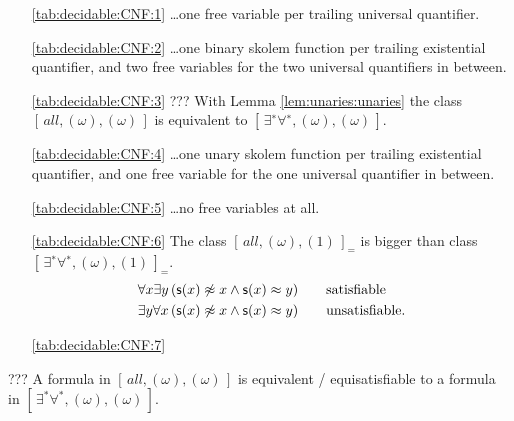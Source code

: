 \begin{itemize}
	\item[\ref{tab:decidable:CNF:1}] 
	\ldots one free variable per trailing universal quantifier.
	
	\item[\ref{tab:decidable:CNF:2}]
	\ldots one binary skolem function per trailing existential quantifier, 
	and two free variables for the two universal quantifiers in between.
	
	\item[\ref{tab:decidable:CNF:3}]
	??? With Lemma \ref{lem:unaries:unaries} the class $[\,all, (\omega), (\omega)\,]$
	is equivalent to $[\,\exists^{∗}\forall^{∗}, (\omega), (\omega)\,]$.
	
	\item[\ref{tab:decidable:CNF:4}]
	\ldots one unary skolem function per trailing existential quantifier, 
	and one free variable for the one universal quantifier in between.
	
	\item[\ref{tab:decidable:CNF:5}]
	\ldots no free variables at all.
	
	\item[\ref{tab:decidable:CNF:6}]
	The class $[\,all, (\omega), (1)\,]_=$
	is bigger than class $[\,\exists^{∗}\forall^{∗}, (\omega), (1)\,]_=$.
\begin{align*}
	\forall x \exists y\,&({\mathsf s}(x)\not\approx x\land {\mathsf s}(x)\approx y)\tag*{satisfiable}
	\\
	\exists y \forall x\,&({\mathsf s}(x)\not\approx x\land {\mathsf s}(x)\approx y)\tag*{unsatisfiable}.
	\end{align*}
	\item[\ref{tab:decidable:CNF:7}]
\end{itemize}

\begin{lemma}\label{lem:unaries:unaries}
	??? A formula in $[\,all, (\omega), (\omega)\,]$ is equivalent / equisatisfiable 
	to a formula in $[\,\exists^*\forall^*, (\omega), (\omega)\,]$.
\end{lemma}

